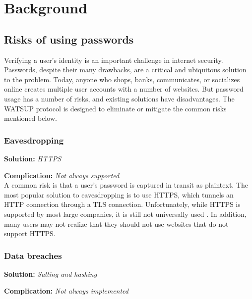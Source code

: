 \section{Background}
\label{sec:background}

\subsection{Risks of using passwords}

Verifying a user's identity is an important challenge in internet security. Passwords, despite their many drawbacks, are a critical and ubiquitous solution to the problem. Today, anyone who shops, banks, communicates, or socializes online creates multiple user accounts with a number of websites. But password usage has a number of risks, and existing solutions have disadvantages. The WATSUP protocol is designed to eliminate or mitigate the common risks mentioned below.

\subsubsection{Eavesdropping}

\textbf{Solution:} \emph{HTTPS}

\noindent\textbf{Complication:} \emph{Not always supported}\\

\noindent A common risk is that a user's password is captured in transit as plaintext. The most popular solution to eavesdropping is to use HTTPS, which tunnels an HTTP connection through a TLS connection. Unfortunately, while HTTPS is supported by most large companies, it is still not universally used \cite{Aas:2016}. In addition, many users may not realize that they should not use websites that do not support HTTPS.

\subsubsection{Data breaches}

\textbf{Solution:} \emph{Salting and hashing}

\noindent\textbf{Complication:} \emph{Not always implemented}\\

